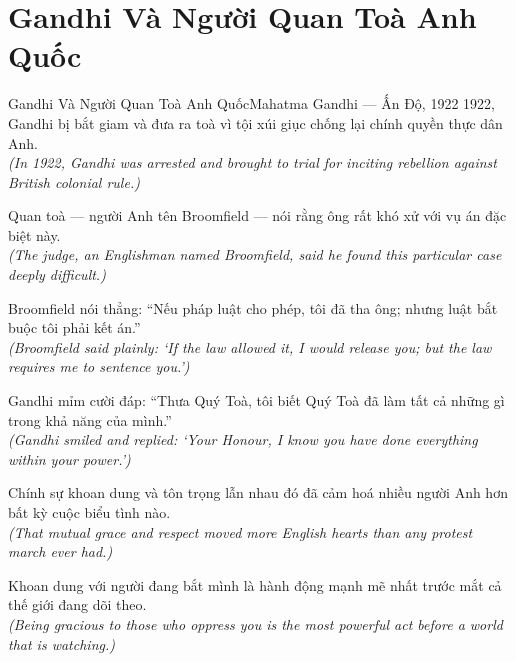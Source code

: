 \section{Gandhi Và Người Quan Toà Anh Quốc}
\begin{truyen}{Gandhi Và Người Quan Toà Anh Quốc}{Mahatma Gandhi --- Ấn Độ, 1922}
 1922, Gandhi bị bắt giam và đưa ra toà vì tội xúi giục chống lại chính quyền thực dân Anh.\\[4pt]
\textit{(In 1922, Gandhi was arrested and brought to trial for inciting rebellion against British colonial rule.)}

Quan toà --- người Anh tên Broomfield --- nói rằng ông rất khó xử với vụ án đặc biệt này.\\[4pt]
\textit{(The judge, an Englishman named Broomfield, said he found this particular case deeply difficult.)}

Broomfield nói thẳng: ``Nếu pháp luật cho phép, tôi đã tha ông; nhưng luật bắt buộc tôi phải kết án.''\\[4pt]
\textit{(Broomfield said plainly: `If the law allowed it, I would release you; but the law requires me to sentence you.')}

Gandhi mỉm cười đáp: ``Thưa Quý Toà, tôi biết Quý Toà đã làm tất cả những gì trong khả năng của mình.''\\[4pt]
\textit{(Gandhi smiled and replied: `Your Honour, I know you have done everything within your power.')}

Chính sự khoan dung và tôn trọng lẫn nhau đó đã cảm hoá nhiều người Anh hơn bất kỳ cuộc biểu tình nào.\\[4pt]
\textit{(That mutual grace and respect moved more English hearts than any protest march ever had.)}

\end{truyen}
\begin{baihoc}
  Khoan dung với người đang bắt mình là hành động mạnh mẽ nhất trước mắt cả thế giới đang dõi theo.\\[4pt]
  \textit{(Being gracious to those who oppress you is the most powerful act before a world that is watching.)}
\end{baihoc}

